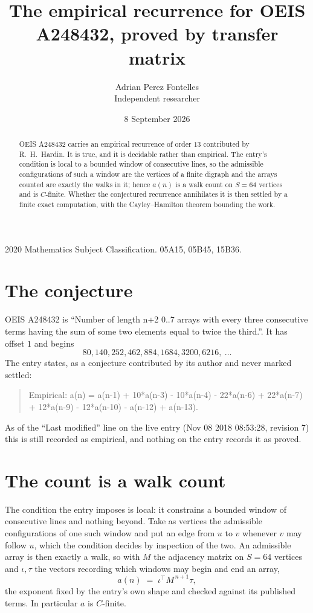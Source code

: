 \documentclass[11pt,a4paper]{article}
\title{The empirical recurrence for OEIS A248432, proved by transfer matrix}
\author{Adrian Perez Fontelles\\ \small Independent researcher}
\date{8 September 2026}
\theoremstyle{plain}
\theoremstyle{definition}
\begin{document}
\maketitle

\begin{abstract}
OEIS A248432 carries an empirical recurrence of order $13$ contributed by R.~H.~Hardin. It is
true, and it is decidable rather than empirical. The entry's condition is local to a bounded window of consecutive lines, so
the admissible configurations of such a window are the vertices of a finite digraph and the
arrays counted are exactly the walks in it; hence $a(n)$ is a walk count on $S=64$ vertices
and is $C$-finite. Whether the conjectured recurrence annihilates it is then settled by a
finite exact computation, with the Cayley--Hamilton theorem bounding the work.
\end{abstract}

\noindent\small 2020 Mathematics Subject Classification. 05A15, 05B45, 15B36.\normalsize

\section{The conjecture}

OEIS A248432 is ``Number of length n+2 0..7 arrays with every three consecutive terms having the sum of some two elements equal to twice the third.''. It has offset $1$ and begins
\[
80, 140, 252, 462, 884, 1684, 3200, 6216,\ \dots
\]
The entry states, as a conjecture contributed by its author and never marked settled:
\begin{quote}
Empirical: a(n) = a(n-1) + 10*a(n-3) - 10*a(n-4) - 22*a(n-6) + 22*a(n-7) + 12*a(n-9) - 12*a(n-10) - a(n-12) + a(n-13).
\end{quote}
As of the ``Last modified'' line on the live entry (Nov 08 2018 08:53:28, revision 7) this is still
recorded as empirical, and nothing on the entry records it as proved.

\section{The count is a walk count}

The condition the entry imposes is local: it constrains a bounded window of consecutive lines and nothing beyond. Take as
vertices the admissible configurations of one such window and put an edge from $u$ to $v$
whenever $v$ may follow $u$, which the condition decides by inspection of the two. An
admissible array is then exactly a walk, so with $M$ the adjacency matrix on $S=64$ vertices
and $\iota,\tau$ the vectors recording which windows may begin and end an array,
\[
a(n)\;=\;\iota^{\!\top}M^{\,n+1}\tau ,
\]
the exponent fixed by the entry's own shape and checked against its published terms. In
particular $a$ is $C$-finite.
\end{document}
